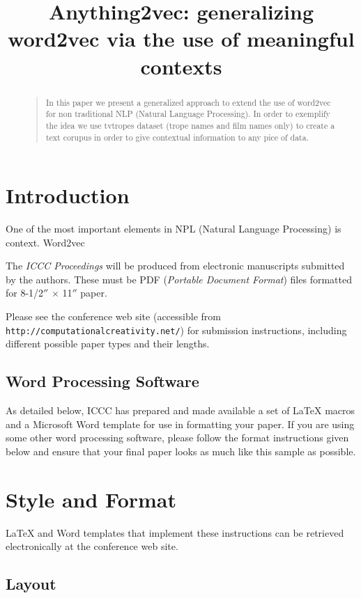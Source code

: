 \documentclass[letterpaper]{article}
\title{Anything2vec: generalizing word2vec via the use of meaningful contexts}
\begin{document}
 
\maketitle
\begin{abstract}
\begin{quote}
In this paper we present a generalized approach to extend the use of word2vec for non traditional NLP (Natural Language Processing). In order to exemplify the idea we use tvtropes dataset (trope names and film names only) to create a text corupus in order to give contextual information to any pice of data.   
\end{quote}
\end{abstract}

\section{Introduction}

One of the most important elements in NPL (Natural Language Processing) is context. Word2vec \cite{mikolov2013} 


The {\it ICCC Proceedings} will be produced from electronic
manuscripts submitted by the authors. These must be PDF ({\em Portable
Document Format}) files formatted for 8-1/2$''$ $\times$ 11$''$ paper.

Please see the conference web site 
(accessible from {\small \tt http://computationalcreativity.net/})
for submission instructions, including 
different possible paper types and their lengths.

\subsection{Word Processing Software}

As detailed below, ICCC has prepared and made available a set of
\LaTeX{} macros and a Microsoft Word template for use in formatting
your paper. If you are using some other word processing software, please follow the format instructions given below and ensure that your final paper looks as much like this sample as possible.

\section{Style and Format}

\LaTeX{} and Word templates that implement these instructions
can be retrieved electronically at the conference web site.

\subsection{Layout}
\end{document}
